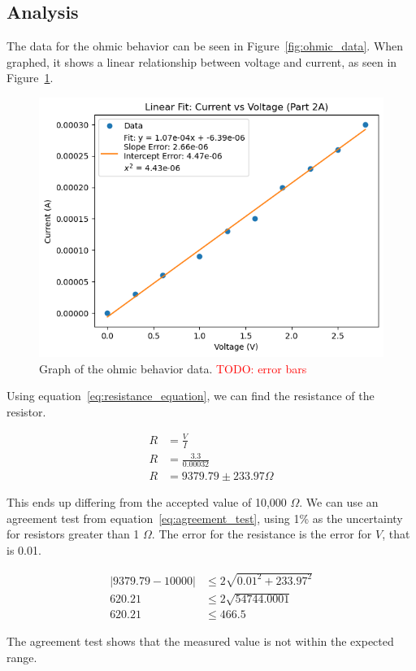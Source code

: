 \documentclass[11pt]{article}
\newcommand{\todo}[1]{\textcolor{red}{TODO: #1}\PackageWarning{TODO:}{#1!}}
\begin{document}
    \subsection{Analysis}\label{subsec:ohmic_analysis}

    The data for the ohmic behavior can be seen in Figure~\ref{fig:ohmic_data}.
    When graphed, it shows a linear relationship between voltage and current, as seen in Figure~\ref{fig:ohmic_graph}.
    \begin{figure}[h!]
        \centering
        \includegraphics[width=1.0\linewidth]{resources/images/part2a_ohmic_graph}
        \caption{Graph of the ohmic behavior data. \todo{error bars}}
        \label{fig:ohmic_graph}
    \end{figure}

    Using equation~\ref{eq:resistance_equation}, we can find the resistance of the resistor.
    \begin{e}
        \begin{align*}
            R &= \frac{V}{I} \\
            R &= \frac{3.3}{0.00032} \\
            R &= 9379.79 \pm 233.97 \Omega
        \end{align*}
    \end{e}
    This ends up differing from the accepted value of 10,000 $\Omega$.
    We can use an agreement test from equation~\ref{eq:agreement_test}, using 1\% as the uncertainty for resistors
    greater than 1 $\Omega$.
    The error for the resistance is the error for $V$, that is 0.01.
    \begin{e}
        \begin{align*}
            |9379.79 - 10000| &\le 2 \sqrt{0.01^2 + 233.97^2} \\
            620.21 &\le 2 \sqrt{54744.0001} \\
            620.21 &\le 466.5
        \end{align*}
    \end{e}
    The agreement test shows that the measured value is not within the expected range.
\end{document}
